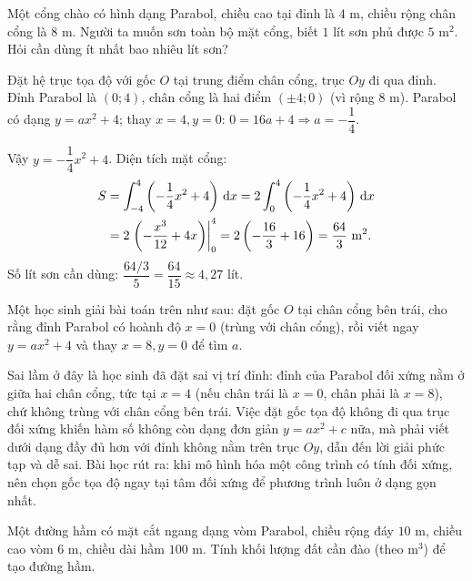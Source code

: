 \begin{hopvidu}
Một cổng chào có hình dạng Parabol, chiều cao tại đỉnh là $4$ m, chiều rộng chân cổng là $8$ m. Người ta muốn sơn toàn bộ mặt cổng, biết $1$ lít sơn phủ được $5$ m$^2$. Hỏi cần dùng ít nhất bao nhiêu lít sơn?
\end{hopvidu}

\begin{loigiai}
Đặt hệ trục tọa độ với gốc $O$ tại trung điểm chân cổng, trục $Oy$ đi qua đỉnh. Đỉnh Parabol là $(0;4)$, chân cổng là hai điểm $(\pm4;0)$ (vì rộng $8$ m). Parabol có dạng $y=ax^2+4$; thay $x=4,y=0$: $0=16a+4 \Rightarrow a=-\dfrac14$.

Vậy $y=-\dfrac14x^2+4$. Diện tích mặt cổng:
\begin{align*}
S&=\int_{-4}^{4}\left(-\frac14x^2+4\right)\,\mathrm{d}x = 2\int_0^4\left(-\frac14x^2+4\right)\,\mathrm{d}x \\
 &= 2\left.\left(-\frac{x^3}{12}+4x\right)\right|_0^4 = 2\left(-\frac{16}{3}+16\right)=\frac{64}{3}\text{ m}^2.
\end{align*}
Số lít sơn cần dùng: $\dfrac{64/3}{5}=\dfrac{64}{15}\approx4{,}27$ lít.
\end{loigiai}

\begin{hopsailam}
Một học sinh giải bài toán trên như sau: đặt gốc $O$ tại chân cổng bên trái, cho rằng đỉnh Parabol có hoành độ $x=0$ (trùng với chân cổng), rồi viết ngay $y=ax^2+4$ và thay $x=8,y=0$ để tìm $a$.

Sai lầm ở đây là học sinh đã đặt sai vị trí đỉnh: đỉnh của Parabol đối xứng nằm ở giữa hai chân cổng, tức tại $x=4$ (nếu chân trái là $x=0$, chân phải là $x=8$), chứ không trùng với chân cổng bên trái. Việc đặt gốc tọa độ không đi qua trục đối xứng khiến hàm số không còn dạng đơn giản $y=ax^2+c$ nữa, mà phải viết dưới dạng đầy đủ hơn với đỉnh không nằm trên trục $Oy$, dẫn đến lời giải phức tạp và dễ sai. Bài học rút ra: khi mô hình hóa một công trình có tính đối xứng, nên chọn gốc tọa độ ngay tại tâm đối xứng để phương trình luôn ở dạng gọn nhất.
\end{hopsailam}

\begin{hopvidu}
Một đường hầm có mặt cắt ngang dạng vòm Parabol, chiều rộng đáy $10$ m, chiều cao vòm $6$ m, chiều dài hầm $100$ m. Tính khối lượng đất cần đào (theo m$^3$) để tạo đường hầm.
\end{hopvidu}

